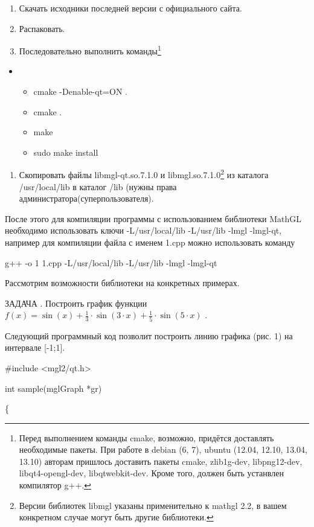 \begin{enumerate}
\item Скачать исходники последней версии с официального сайта.
\item Распаковать.
\item Последовательно выполнить команды\footnote{Перед выполнением команды cmake, возможно, придётся доставлять
необходимые пакеты. При работе в debian (6, 7), ubuntu (12.04, 12.10, 13.04, 13.10) авторам пришлось доставить  пакеты
cmake, zlib1g-dev, libpng12-dev, libqt4-opengl-dev, libqtwebkit-dev. Кроме того, должен быть устанвлен компилятор g++.}
\end{enumerate}
\begin{itemize}
\item \begin{itemize}
\item cmake -Denable-qt=ON .
\item cmake .
\item make
\item sudo make install
\end{itemize}
\end{itemize}
\begin{enumerate}
\item Скопировать файлы libmgl-qt.so.7.1.0 и libmgl.so.7.1.0\footnote{Версии библиотек libmgl указаны применительно к
mathgl 2.2, в вашем конкретном случае могут быть другие библиотеки.} из каталога /usr/local/lib в каталог /lib (нужны
права администратора(суперпользователя).
\end{enumerate}
После этого для компиляции программы с использованием библиотеки MathGL необходимо использовать ключи -L/usr/local/lib
-L/usr/lib -lmgl -lmgl-qt, например для компиляции файла с именем 1.cpp можно использовать команду

{\upshape
g++ -o 1  1.cpp -L/usr/local/lib -L/usr/lib -lmgl -lmgl-qt}

Рассмотрим возможности библиотеки на конкретных примерах.

ЗАДАЧА {\theqwerty\label{seq:ref0}}. Построить график функции  $f(x)=\sin (x)+\frac{1}{3}\cdot
\sin (3\cdot x)+\frac{1}{5}\cdot \sin (5\cdot x)$ .

Следующий программный код позволит построить линию графика (рис. 1) на интервале [-1;1].

\#include {\textless}mgl2/qt.h{\textgreater}

int sample(mglGraph *gr)

\{

